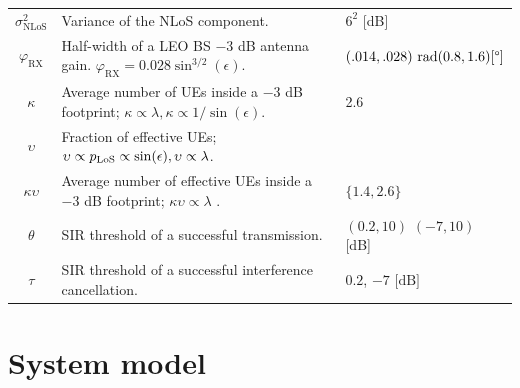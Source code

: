 \documentclass[lettersize,journal]{IEEEtran}
\begin{document}
\begin{table}
\begin{center}
\begin{tabular}{|c|p{4.5cm}|p{1.9cm}|}
      $\sigma^2_{\text{NLoS}}$& Variance of the NLoS component. & $6^2$ [dB] \\
      $\varphi_{\text{RX}}$ & Half-width of a LEO BS $-3$ dB antenna gain. $\varphi_{\text{RX}} = 0.028 \sin^{3/2}(\epsilon).$&$(.014,.028) \text{ rad}\hfill\break (0.8,1.6)[\degree]$ \\      
      $\kappa$& Average number of UEs inside a $-3$ dB footprint; $\kappa \propto \lambda, \kappa \propto 1/\sin(\epsilon)$.& 2.6 \\
      $\upsilon$&Fraction of effective UEs; $\hfill \break\upsilon \propto p_{\text{LoS}} \propto\sin(\epsilon),  \upsilon \propto \lambda$. & \\      
      $\kappa \upsilon$& Average number of effective UEs inside a $-3$ dB footprint; $\kappa \upsilon \propto \lambda $ .& $\{1.4,2.6 \}$ \\
      $\theta$ & SIR threshold of a successful transmission.&$(0.2,10)$  \break \hfill $(-7,10)$ [dB]   \\
      $\tau$ & SIR threshold of a successful interference cancellation.& $0.2$, $-7\text{ [dB]}$\\  
      \hline
    \end{tabular}
  \end{center}
\end{table}   


\section{System model}
\end{document}
